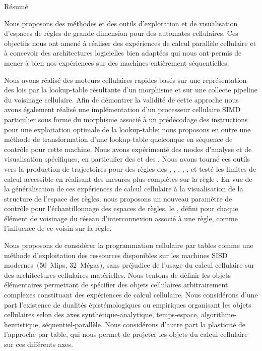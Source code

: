 \begin{small}
\begin{center}\begin{Huge}R\'esum\'e\end{Huge}\end{center}
\bigskip\bigskip

Nous proposons des m\'ethodes et des outils d'exploration et de
visualisation d'espaces de r\`egles de grande dimension pour des
automates cellulaires. %
Ces objec\-tifs nous ont amen\'e \`a r\'ealiser des exp\'eriences de calcul
parall\`ele cellulaire et \`a concevoir des architectures logicielles bien
adapt\'ees qui nous ont permis de mener \`a bien nos exp\'eriences sur des
machines enti\`erement s\'equentielles.

Nous avons r\'ealis\'e des moteurs cellulaires rapides bas\'es sur une
repr\'esentation des lois par la lookup-table r\'esultante d'un morphisme
et sur une collecte pipeline du voisinage cellulaire. %
Afin de d\'emontrer la validit\'e de cette approche nous avons \'egalement
r\'ealis\'e une impl\'ementation d'un processeur cellulaire SIMD particulier
sous forme du morphisme associ\'e \`a un pr\'ed\'ecodage des instructions pour
une exploitation optimale de la lookup-table; nous proposons en outre
une m\'ethode de transformation d'une lookup-table quelconque en
s\'equence de contr\^ole pour cette machine. %
Nous avons exp\'eriment\'e des modes d'analyse et de visualisation
sp\'ecifiques, en particulier des 
et des . %
Nous avons tourn\'e ces outils vers la production de trajectoires pour
des r\`egles des  , ,
, , , et test\'e les
limites de calcul accessible en r\'ealisant des mesures plus compl\`etes
sur la r\`egle . %
En vue de la g\'en\'eralisation de ces exp\'eriences de calcul cellulaire \`a
la visualisation de la structure de l'espace des r\`egles, nous
proposons un nouveau param\`etre de contr\^ole pour l'\'echantillonnage des
espaces de r\`egles, le , d\'efini pour
chaque \'el\'ement de voisinage du r\'eseau d'interconnexion associ\'e \`a une
r\`egle, comme l'influence de ce voisin sur la r\`egle.

Nous proposons de consid\'erer la programmation cellulaire par tables
comme une m\'ethode d'exploitation des ressources disponibles sur les
machines SISD modernes~(50~Mips, 32~M\'egas), sans pr\'ejudice de l'usage
du calcul cellulaire sur des architectures cellulaires mat\'erielles. %
Nous tentons de d\'efinir les objets \'el\'ementaires permettant de
sp\'ecifier des objets cellulaires arbitrairement complexes constituant
des exp\'eriences de calcul cellulaire. %
Nous consid\'erons d'une part l'existence de dualit\'es \'epist\'emologiques
ou empiriques organisant les objets cellulaires selon des axes
synth\'etique-analytique, temps-espace, algorithme-heuristique,
s\'equentiel-parall\`ele. %
Nous consid\'erons d'autre part la plasticit\'e de l'approche par table,
qui nous permet de projeter les objets du calcul cellulaire
sur ces diff\'erents axes.


\end{small}
